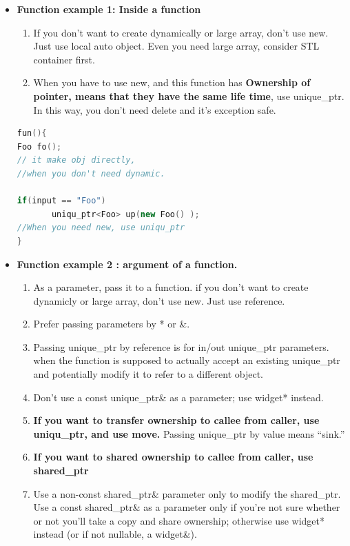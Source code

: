 \documentclass[a4paper,12pt,twoside]{book}
\begin{document}
\begin{itemize}
\item \textbf{Function example 1: Inside a function}
\begin{enumerate}
\item If you don't want to create dynamically or large array, don't use new. Just use local auto object. Even you need large array, consider STL container first.
\item When you have to use new, and this function has \textbf{Ownership of pointer, means that they have the same life time},  use unique\_ptr. In this way, you don't need delete and it's exception safe.
\end{enumerate}
\begin{lstlisting}[frame=single, language=c++]
fun(){
Foo fo();
// it make obj directly,
//when you don't need dynamic.

if(input == "Foo")
       uniqu_ptr<Foo> up(new Foo() );
//When you need new, use uniqu_ptr
}
\end{lstlisting}


\item \textbf{Function example 2 : argument of a function.}
\begin{enumerate}
\item As a parameter, pass it to a function. if you don't want to create dynamicly or large array, don't use new. Just use reference.

\item Prefer passing parameters by * or \&.

\item Passing unique\_ptr by reference is for in/out unique\_ptr parameters. when the function is supposed to actually accept an existing unique\_ptr and potentially modify it to refer to a different object. 

\item Don’t use a const unique\_ptr\& as a parameter; use widget* instead.



\item \textbf{If you want to transfer ownership to callee from caller, use uniqu\_ptr, and use move.} Passing unique\_ptr by value means “sink.”

\item \textbf{If you want to shared ownership to callee from caller, use shared\_ptr}

\item Use a non-const shared\_ptr\& parameter only to modify the shared\_ptr. Use a const shared\_ptr\& as a parameter only if you’re not sure whether or not you’ll take a copy and share ownership; otherwise use widget* instead (or if not nullable, a widget\&).


\end{enumerate}
\end{itemize}
\end{document}
